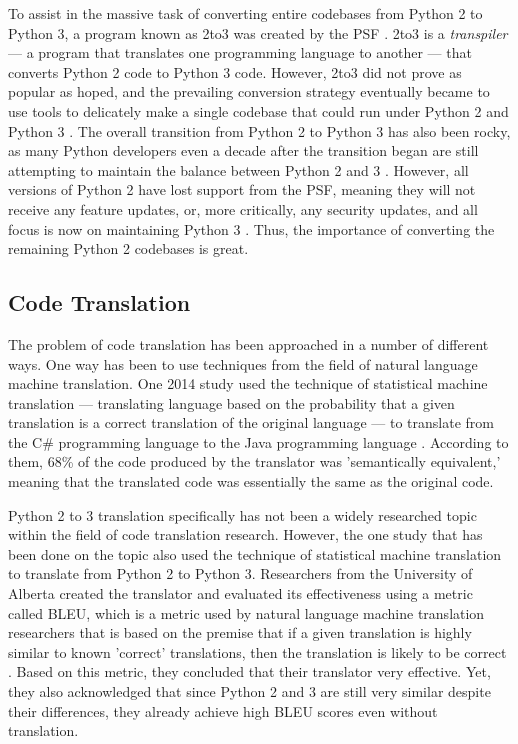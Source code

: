 To assist in the massive task of converting entire codebases from Python 2 to Python 3, a program known as 2to3 was created by the PSF \autocite{2to3}. 2to3 is a \textit{transpiler} --- a program that translates one programming language to another --- that converts Python 2 code to Python 3 code. However, 2to3 did not prove as popular as hoped, and the prevailing conversion strategy eventually became to use tools to delicately make a single codebase that could run under Python 2 and Python 3 \autocite{Malloy}. The overall transition from Python 2 to Python 3 has also been rocky, as many Python developers even a decade after the transition began are still attempting to maintain the balance between Python 2 and 3 \autocite{Malloy}. However, all versions of Python 2 have lost support from the PSF, meaning they will not receive any feature updates, or, more critically, any security updates, and all focus is now on maintaining Python 3 \autocite{Sunsetting}. Thus, the importance of converting the remaining Python 2 codebases is great.

\subsection{Code Translation}
The problem of code translation has been approached in a number of different ways. One way has been to use techniques from the field of natural language machine translation. One 2014 study used the technique of statistical machine translation --- translating language based on the probability that a given translation is a correct translation of the original language --- to translate from the C\# programming language to the Java programming language \autocite{Karaivanov}. According to them, 68\% of the code produced by the translator was 'semantically equivalent,' meaning that the translated code was essentially the same as the original code.

Python 2 to 3 translation specifically has not been a widely researched topic within the field of code translation research. However, the one study that has been done on the topic also used the technique of statistical machine translation to translate from Python 2 to Python 3. Researchers from the University of Alberta created the translator and evaluated its effectiveness using a metric called BLEU, which is a metric used by natural language machine translation researchers that is based on the premise that if a given translation is highly similar to known 'correct' translations, then the translation is likely to be correct \autocite{Aggarwal}. Based on this metric, they concluded that their translator very effective. Yet, they also acknowledged that since Python 2 and 3 are still very similar despite their differences, they already achieve high BLEU scores even without translation.

